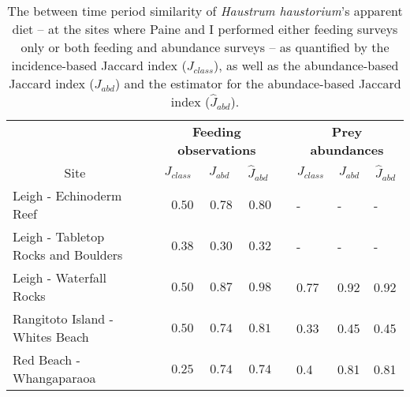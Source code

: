 \begin{table}[!htbp]
\caption{The between time period similarity of
  \textit{Haustrum haustorium}'s apparent diet 
  -- at the sites where Paine and I performed either feeding surveys only
  or both feeding and abundance surveys --
  as quantified by 
  the incidence-based Jaccard index ($J_{class}$), as well as
  the abundance-based Jaccard index ($J_{abd}$) and
  the estimator for the abundace-based Jaccard index ($\hat{J}_{abd}$). 
  \label{tab:Jnobsabund}} 
{\centering
\begin{tabular}{lcrrrclll}
\hline
\multicolumn{1}{c}{\bfseries }&\multicolumn{1}{c}{\bfseries }&\multicolumn{3}{c}{\bfseries Feeding observations}&\multicolumn{1}{c}{\bfseries }&\multicolumn{3}{c}{\bfseries Prey abundances}\tabularnewline
\cline{3-5} \cline{7-9}
\multicolumn{1}{c}{Site}&\multicolumn{1}{c}{}&\multicolumn{1}{c}{$J_{class}$}&\multicolumn{1}{c}{$J_{abd}$}&\multicolumn{1}{c}{$\hat{J}_{abd}$}&\multicolumn{1}{c}{}&\multicolumn{1}{c}{$J_{class}$}&\multicolumn{1}{c}{$J_{abd}$}&\multicolumn{1}{c}{$\hat{J}_{abd}$}\tabularnewline
\hline
Leigh - Echinoderm Reef&&$0.50$&$0.78$&$0.80$&&-&-&-\tabularnewline
Leigh - Tabletop Rocks and Boulders&&$0.38$&$0.30$&$0.32$&&-&-&-\tabularnewline
Leigh - Waterfall Rocks&&$0.50$&$0.87$&$0.98$&&0.77&0.92&0.92\tabularnewline
Rangitoto Island - Whites Beach&&$0.50$&$0.74$&$0.81$&&0.33&0.45&0.45\tabularnewline
Red Beach - Whangaparaoa&&$0.25$&$0.74$&$0.74$&&0.4&0.81&0.81\tabularnewline
\hline
\end{tabular}}
\end{table}
